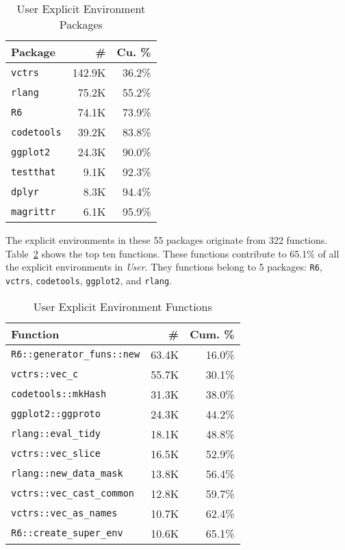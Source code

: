 \documentclass[10pt,review,sigplan,authorversion=true]{acmart}
\newcommand{\code}[1]{\lstinline |#1|\xspace}
\begin{document}
\begin{table}[!h]
  \small
  \caption{User Explicit Environment Packages} \label{table:user_explicit_pack}
  \centering
  \begin{tabular}{lrr}
    \toprule
    \textbf{Package}&\textbf{\#}&\textbf{Cu. \%}\\
    \midrule
    \code{vctrs}&142.9K&36.2\%\\
    \code{rlang}&75.2K&55.2\%\\
    \code{R6}&74.1K&73.9\%\\
    \code{codetools}&39.2K&83.8\%\\
    \code{ggplot2}&24.3K&90.0\%\\
    \code{testthat}&9.1K&92.3\%\\
    \code{dplyr}&8.3K&94.4\%\\
    \code{magrittr}&6.1K&95.9\%\\
    \bottomrule
  \end{tabular}
\end{table}

The explicit environments in these 55 packages originate from 322 functions.
Table~\ref{table:user_explicit_fun} shows the top ten functions. These functions
contribute to 65.1\% of all the explicit environments in \emph{User}. They
functions belong to 5 packages: \code{R6}, \code{vctrs}, \code{codetools},
\code{ggplot2}, and \code{rlang}.

\begin{table}[!h]
  \small
  \caption{User Explicit Environment Functions} \label{table:user_explicit_fun}
  \centering
  \begin{tabular}{lrr}
    \toprule
    \textbf{Function}&\textbf{\#}&\textbf{Cum. \%}\\
    \midrule
    \code{R6::generator_funs::new}&63.4K&16.0\%\\
    \code{vctrs::vec_c}&55.7K&30.1\%\\
    \code{codetools::mkHash}&31.3K&38.0\%\\
    \code{ggplot2::ggproto}&24.3K&44.2\%\\
    \code{rlang::eval_tidy}&18.1K&48.8\%\\
    \code{vctrs::vec_slice}&16.5K&52.9\%\\
    \code{rlang::new_data_mask}&13.8K&56.4\%\\
    \code{vctrs::vec_cast_common}&12.8K&59.7\%\\
    \code{vctrs::vec_as_names}&10.7K&62.4\%\\
    \code{R6::create_super_env}&10.6K&65.1\%\\
    \bottomrule
  \end{tabular}
\end{table}
\end{document}
